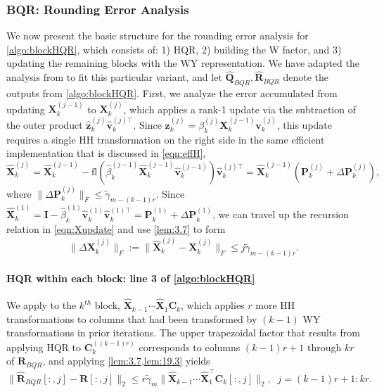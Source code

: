 \documentclass[review,onefignum,onetabnum]{siamart190516}
\newcommand{\bb}[1]{\mathbf{#1}}
\newcommand{\fl}{\mathrm{fl}}
\begin{document}
\subsubsection{BQR: Rounding Error Analysis}\label{sec:BQRerr}
We now present the basic structure for the rounding error analysis for \cref{algo:blockHQR}, which consists of: 1) HQR, 2) building the W factor, and 3) updating the remaining blocks with the WY representation.
We have adapted the analysis from \cite{Higham2002} to fit this particular variant, and let $\hat{\bb{Q}}_{BQR},\hat{\bb{R}}_{BQR}$ denote the outputs from \cref{algo:blockHQR}.
First, we analyze the error accumulated from updating $\bb{X}_k^{(j-1)}$ to $\bb{X}_k^{(j)}$, which applies a rank-1 update via the subtraction of the outer product $\hat{\bb{z}}_{k}^{(j)}\hat{\bb{v}}_{k}^{(j)\top}$.
Since $\bb{z}_{k}^{(j)} = \beta_k^{(j)}\bb{X}_{k}^{(j-1)}\bb{v}_{k}^{(j)}$, this update requires a single HH transformation on the right side in the same efficient implementation that is discussed in \cref{eqn:effH},
\begin{equation}
\hat{\bb{X}}_k^{(j)} = \hat{\bb{X}}_k^{(j-1)} - \fl(\hat{\beta}_k^{(j-1)}\hat{\bb{X}}_k^{(j-1)}\hat{\bb{v}}_k^{(j-1)})\hat{\bb{v}}_k^{(j)\top} = \hat{\bb{X}}_k^{(j-1)}(\bb{P}_k^{(j)}+\Delta \bb{P}_k^{(j)}), \label{eqn:Xupdate}
\end{equation}
where $\|\Delta \bb{P}_k^{(j)}\|_F \leq \tilde{\gamma}_{m-(k-1)r}$.
Since $\hat{\bb{X}}_k^{(1)} = \bb{I} - \hat{\beta}_k^{(1)}\hat{\bb{v}}_k^{(1)}\hat{\bb{v}}_k^{(1)\top} = \bb{P}_k^{(1)} + \Delta \bb{P}_k^{(1)}$, we can travel up the recursion relation in \cref{eqn:Xupdate} and use \cref{lem:3.7} to form
\begin{equation}
	\|\Delta \bb{X}_k^{(j)} \|_F := \|\hat{\bb{X}}_k^{(j)}-\bb{X}_k^{(j)}\|_F \leq j\tilde{\gamma}_{m-(k-1)r}. \label{eqn:deltX}
\end{equation}

\paragraph{HQR within each block: line 3 of \cref{algo:blockHQR}}
We apply  to the $k^{th}$ block, $\hat{\bb{X}}_{k-1}\cdots\hat{\bb{X}}_1\bb{C}_k$, which applies $r$ more HH transformations to columns that had been transformed by $(k-1)$ WY transformations in prior iterations.
The upper trapezoidal factor that results from applying HQR to $\bb{C}_{k}^{((k-1)r)}$ corresponds to columns $(k-1)r+1$ through $kr$ of $\hat{\bb{R}}_{BQR}$, and applying \cref{lem:3.7,lem:19.3} yields
\begin{equation*}
	\|\hat{\bb{R}}_{BQR}[:,j]-\bb{R}[:,j]\|_2 \leq r\tilde{\gamma}_{m}\|\hat{\bb{X}}_{k-1}\cdots\hat{\bb{X}}_1^{\top}\bb{C}_k[:,j]\|_2,\;\; j=(k-1)r+1:kr.%
\end{equation*}
\end{document}
